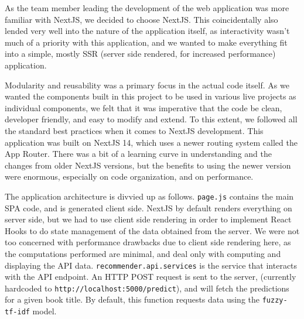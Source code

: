 As the team member leading the development of the web application was more familiar with NextJS, we decided to choose NextJS. This coincidentally also lended very well into the nature of the application itself, as interactivity wasn't much of a priority with this application, and we wanted to make everything fit into a simple, mostly SSR (server side rendered, for increased performance) application.

Modularity and reusability was a primary focus in the actual code itself. As we wanted the components built in this project to be used in various live projects as individual components, we felt that it was imperative that the code be clean, developer friendly, and easy to modify and extend. To this extent, we followed all the standard best practices when it comes to NextJS development. This application was built on NextJS 14, which uses a newer routing system called the App Router. There was a bit of a learning curve in understanding and the changes from older NextJS versions, but the benefits to using the newer version were enormous, especially on code organization, and on performance.

The application architecture is divvied up as follows.
\texttt{page.js} contains the main SPA code, and is generated client side. NextJS by default renders everything on server side, but we had to use client side rendering in order to implement React Hooks to do state management of the data obtained from the server. We were not too concerned with performance drawbacks due to client side rendering here, as the computations performed are minimal, and deal only with computing and displaying the API data.
\texttt{recommender.api.services} is the service that interacts with the API endpoint. An HTTP POST request is sent to the server, (currently hardcoded to \texttt{http://localhost:5000/predict}), and will fetch the predictions for a given book title. By default, this function requests data using the \texttt{fuzzy-tf-idf} model.